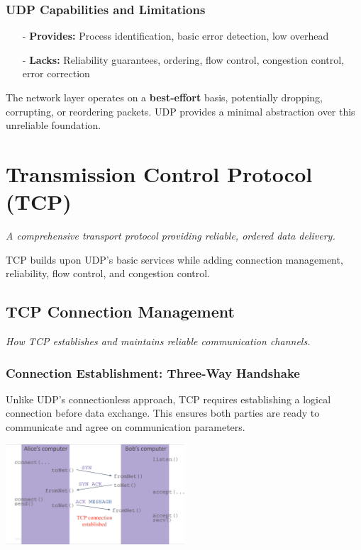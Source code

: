 \documentclass[../../compsys.tex]{subfiles}
\begin{document}
\subsubsection{UDP Capabilities and Limitations}
\begin{itemize}
  \item[-] \textbf{Provides:} Process identification, basic error detection, low overhead
  \item[-] \textbf{Lacks:} Reliability guarantees, ordering, flow control, congestion control, error correction
\end{itemize}

The network layer operates on a \textbf{best-effort} basis, potentially dropping, corrupting, or reordering packets. UDP provides a minimal abstraction over this unreliable foundation.

\section{Transmission Control Protocol (TCP)}
\textit{A comprehensive transport protocol providing reliable, ordered data delivery.}

TCP builds upon UDP's basic services while adding connection management, reliability, flow control, and congestion control.

\subsection{TCP Connection Management}
\textit{How TCP establishes and maintains reliable communication channels.}

\subsubsection{Connection Establishment: Three-Way Handshake}
Unlike UDP's connectionless approach, TCP requires establishing a logical connection before data exchange. This ensures both parties are ready to communicate and agree on communication parameters.

\begin{center}
  \includegraphics[width=0.5\textwidth]{images/handshake.png}
\end{center}
\end{document}
